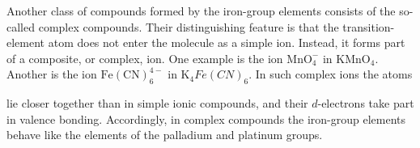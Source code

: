 Another class of compounds formed by the iron-group elements consists of the so-called complex compounds.
Their distinguishing feature is that the transition-element atom does not enter the molecule as a simple ion.
Instead, it forms part of a composite, or complex, ion.
One example is the ion $\mathrm{MnO}_4^-$ in $\mathrm{KMnO}_4$.
Another is the ion $\mathrm{Fe(CN)}_6^{4-}$ in $\mathrm K_4Fe(CN)_6$.
In such complex ions the atoms

lie closer together than in simple ionic compounds, and their $d$-electrons take part in valence bonding.
Accordingly, in complex compounds the iron-group elements behave like the elements of the palladium and platinum groups.
